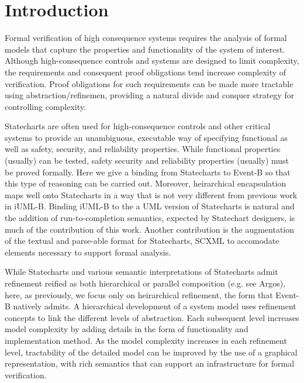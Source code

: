 
\section{Introduction}
\label{sec:introduction}

Formal verification of high consequence systems requires the analysis
of formal models that capture the properties and functionality of the
system of interest. Although high-consequence controls and systems are
designed to limit complexity, the requirements and consequent proof
obligations tend increase complexity of verification.  Proof
obligations for such requirements can be made more tractable using
abstraction/refinemen, providing a natural divide and conquer
strategy for controlling complexity.

Statecharts\cite{Harel} are often used for high-consequence controls
and other critical systems to provide an unambiguous, executable way
of specifying functional as well as safety, security, and reliability
properties.  While functional properties (usually) can be tested,
safety security and reliability properties (usually) must be proved
formally.  Here we give a binding from Statecharts to Event-B so that
this type of reasoning can be carried out.  Moreover, heirarchical
encapsulation maps well onto Statecharts in a way that is not very
different from previous work in iUML-B\cite{snook14:_b_statem}.
Binding iUML-B to the a UML version of Statecharts is natural and the
addition of run-to-completion semantics, expected by Statechart
designers, is much of the contribution of this work.  Another
contribution is the augmentation of the textual and parse-able format
for Statecharts, SCXML to accomodate elements necessary to support formal
analysis. 

While Statecharts and various semantic interpretations of Statecharts
admit refinement reified as both hierarchical or parallel composition
(e.g. see Argos\cite{Maraninchi91theargos}), here, as
previously\cite{snook14:_b_statem}, we focus only on heirarchical
refinement, the form that Event-B natively admits.
  A hierarchical development of a system model uses refinement
concepts to link the different levels of abstraction. Each subsequent
level increases model complexity by adding details in the form of
functionality and implementation method. As the model complexity
increases in each refinement level, tractability of the detailed model
can be improved by the use of a graphical representation, with rich
semantics that can support an infrastructure for formal verification.

